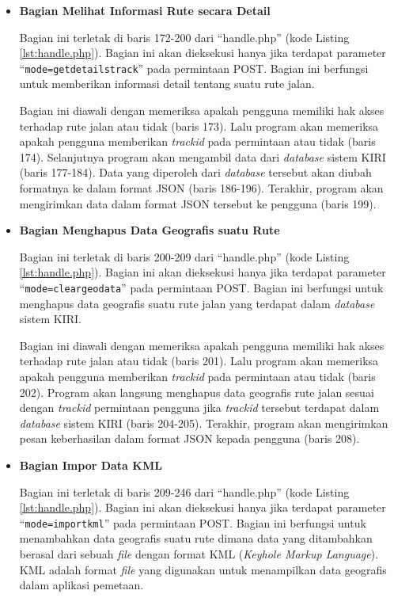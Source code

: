 \documentclass[a4paper,twoside]{article}
\begin{document}
\begin{enumerate}
\begin{itemize}
\item \textbf{Bagian Melihat Informasi Rute secara Detail}

Bagian ini terletak di baris 172-200 dari ``handle.php'' (kode Listing \ref{lst:handle.php}). Bagian ini akan dieksekusi hanya jika terdapat parameter ``\texttt{mode=getdetailstrack}'' pada permintaan POST. Bagian ini berfungsi untuk memberikan informasi detail tentang suatu rute jalan.

Bagian ini diawali dengan memeriksa apakah pengguna memiliki hak akses terhadap rute jalan atau tidak (baris 173). Lalu program akan memeriksa apakah pengguna memberikan \textit{trackid} pada permintaan atau tidak (baris 174). Selanjutnya program akan mengambil data dari \textit{database} sistem KIRI (baris 177-184). Data yang diperoleh dari \textit{database} tersebut akan diubah formatnya ke dalam format JSON (baris 186-196). Terakhir, program akan mengirimkan data dalam format JSON tersebut ke pengguna (baris 199).

\item \textbf{Bagian Menghapus Data Geografis suatu Rute}

Bagian ini terletak di baris 200-209 dari ``handle.php'' (kode Listing \ref{lst:handle.php}). Bagian ini akan dieksekusi hanya jika terdapat parameter ``\texttt{mode=cleargeodata}'' pada permintaan POST. Bagian ini berfungsi untuk menghapus data geografis suatu rute jalan yang terdapat dalam \textit{database} sistem KIRI.

Bagian ini diawali dengan memeriksa apakah pengguna memiliki hak akses terhadap rute jalan atau tidak (baris 201). Lalu program akan memeriksa apakah pengguna memberikan \textit{trackid} pada permintaan atau tidak (baris 202). Program akan langsung menghapus data geografis rute jalan sesuai dengan \textit{trackid} permintaan pengguna jika \textit{trackid} tersebut terdapat dalam \textit{database} sistem KIRI (baris 204-205). Terakhir, program akan mengirimkan pesan keberhasilan dalam format JSON kepada pengguna (baris 208).

\item \textbf{Bagian Impor Data KML}

Bagian ini terletak di baris 209-246 dari ``handle.php'' (kode Listing \ref{lst:handle.php}). Bagian ini akan dieksekusi hanya jika terdapat parameter ``\texttt{mode=importkml}'' pada permintaan POST. Bagian ini berfungsi untuk menambahkan data geografis suatu rute dimana data yang ditambahkan berasal dari sebuah \textit{file} dengan format KML (\textit{Keyhole Markup Language}). KML adalah format \textit{file} yang digunakan untuk menampilkan data geografis dalam aplikasi pemetaan\cite{kml}. 


\end{itemize}
\end{enumerate}
\end{document}
